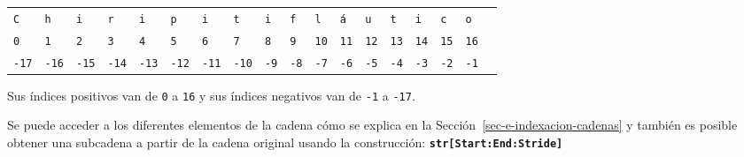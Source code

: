 \documentclass[
  spanish,
  letterpaper,
]{scrbook}
\theoremstyle{definition}
\theoremstyle{remark}
\begin{document}
\begin{tcolorbox}
\begin{longtable}[]{@{}
  >{\centering\arraybackslash}p{}
  >{\centering\arraybackslash}p{}
  >{\centering\arraybackslash}p{}
  >{\centering\arraybackslash}p{}
  >{\centering\arraybackslash}p{}
  >{\centering\arraybackslash}p{}
  >{\centering\arraybackslash}p{}
  >{\centering\arraybackslash}p{}
  >{\centering\arraybackslash}p{}
  >{\centering\arraybackslash}p{}
  >{\centering\arraybackslash}p{}
  >{\centering\arraybackslash}p{}
  >{\centering\arraybackslash}p{}
  >{\centering\arraybackslash}p{}
  >{\centering\arraybackslash}p{}
  >{\centering\arraybackslash}p{}
  >{\centering\arraybackslash}p{}
  >{\centering\arraybackslash}p{}@{}}
\toprule\noalign{}
\endhead
\bottomrule\noalign{}
\endlastfoot
\texttt{C} & \texttt{h} & \texttt{i} & \texttt{r} & \texttt{i} &
\texttt{p} & \texttt{i} & \texttt{t} & \texttt{i} & \texttt{f} &
\texttt{l} & \texttt{á} & \texttt{u} & \texttt{t} & \texttt{i} &
\texttt{c} & \texttt{o} & \\
\texttt{0} & \texttt{1} & \texttt{2} & \texttt{3} & \texttt{4} &
\texttt{5} & \texttt{6} & \texttt{7} & \texttt{8} & \texttt{9} &
\texttt{10} & \texttt{11} & \texttt{12} & \texttt{13} & \texttt{14} &
\texttt{15} & \texttt{16} & \\
\texttt{-17} & \texttt{-16} & \texttt{-15} & \texttt{-14} & \texttt{-13}
& \texttt{-12} & \texttt{-11} & \texttt{-10} & \texttt{-9} & \texttt{-8}
& \texttt{-7} & \texttt{-6} & \texttt{-5} & \texttt{-4} & \texttt{-3} &
\texttt{-2} & \texttt{-1} & \\
\end{longtable}

Sus índices positivos van de \texttt{0} a \texttt{16} y sus índices
negativos van de \texttt{-1} a \texttt{-17}.

Se puede acceder a los diferentes elementos de la cadena cómo se explica
en la Sección~\ref{sec-e-indexacion-cadenas} y también es posible
obtener una subcadena a partir de la cadena original usando la
construcción: \textbf{\texttt{str{[}Start:End:Stride{]}}}


\end{tcolorbox}
\end{document}

